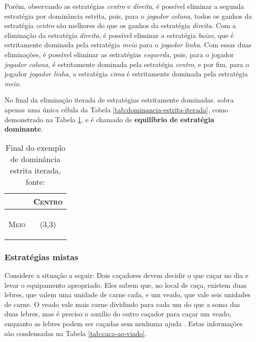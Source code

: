 Porém, observando as estratégias \emph{centro} e \emph{direita}, é possível eliminar a segunda estratégia por dominância estrita, pois, para o \emph{jogador coluna}, todos os ganhos da estratégia \emph{centro} são melhores do que os ganhos da estratégia \emph{direita}. Com a eliminação da estratégia \emph{direita}, é possível eliminar a estratégia \emph{baixo}, que é estritamente dominada pela estratégia \emph{meio} para o \emph{jogador linha}. Com essas duas eliminações, é possível eliminar as estratégias \emph{esquerda}, pois, para o jogador \emph{jogador coluna}, é estritamente dominada pela estratégia \emph{centro}, e por fim, para o jogador \emph{jogador linha}, a estratégia \emph{cima} é estritamente dominada pela estratégia \emph{meio}.

No final da eliminação iterada de estratégias estritamente dominadas. sobra apenas uma única célula da Tabela \ref{tab:dominancia-estrita-iterada}, como demonstrado na Tabela \ref{tab:final-dominancia-estrita-iterada}, e é chamado de \textbf{equilíbrio de estratégia dominante}.

\begin{table}[ht]
\centering
\begin{tabular}{|c|c|}
\cline{2-2}
\multicolumn{1}{c|}{} & {\scshape Centro} \tabularnewline
\hline
\begin{turn}{90}
{\scshape Meio}
\end{turn} &  {\Large(}{\Large 3,}{\Large 3)}\tabularnewline
\hline
\end{tabular}
\caption{Final do exemplo de dominância estrita iterada, fonte: \cite{spaniel_2011}}
\label{tab:final-dominancia-estrita-iterada}
\end{table}

\subsubsection{Estratégias mistas}

Considere a situação a seguir: Dois caçadores devem decidir o que caçar no dia e levar o equipamento apropriado. Eles sabem que, no local de caça, existem duas lebres, que valem uma unidade de carne cada, e um veado, que vale seis unidades de carne. O veado vale mais carne dividindo para cada um do que a soma das duas lebres, mas é preciso o auxílio do outro caçador para caçar um veado, enquanto as lebres podem ser caçadas sem nenhuma ajuda \cite{spaniel_2011}. Estas informações são condensadas na Tabela \ref{tab:caca-ao-viado}.

